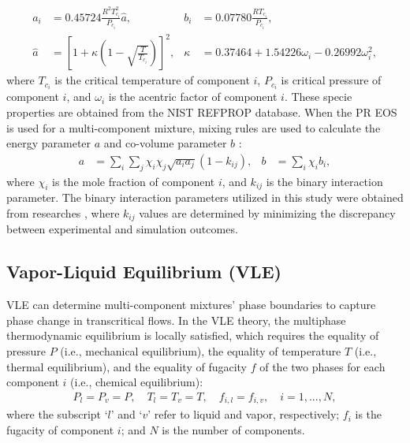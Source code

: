 \begin{align}
    a_i &= 0.45724\frac{R^2 T_{c_i}^2}{P_{c_i}} \hat{a} , &b_i&=0.07780\frac{RT_{c_i}}{P_{c_i}} \label{eq:ab},\\
    \hat{a}&=\left[1+\kappa\left(1-\sqrt{\frac{T}{T_{c_i}}}\right)\right]^2, &\kappa&=0.37464+1.54226\omega_i-0.26992\omega_i^2,
\end{align}
where $T_{c_i}$ is the critical temperature of component $i$, $P_{c_i}$ is critical pressure of component $i$, and $\omega_i$ is the acentric factor of component $i$. These specie properties are obtained from the NIST REFPROP database. When the PR EOS is used for a multi-component mixture, mixing rules are used to calculate the energy parameter $a$ and co-volume parameter $b$ \cite{reid1977properties}:
\begin{align}
a&=\sum_i\sum_j\chi_i\chi_j\sqrt{a_ia_j}(1-k_{ij}),& b&=\sum_i\chi_i b_i,\label{eq:mix}
\end{align}
where $\chi_i$ is the mole fraction of component $i$, and $k_{ij}$ is the binary interaction parameter. The binary interaction parameters utilized in this study were obtained from researches \cite{eliosa2009vapor,garcia2011vapor}, where $k_{ij}$ values are determined by minimizing the discrepancy between experimental and simulation outcomes.

\subsection{Vapor-Liquid Equilibrium (VLE)}
VLE can determine multi-component mixtures' phase boundaries to capture phase change in transcritical flows. In the VLE theory, the multiphase thermodynamic equilibrium is locally satisfied, which requires the equality of pressure $P$ (i.e., mechanical equilibrium), the equality of temperature $T$ (i.e., thermal equilibrium), and the equality of fugacity $f$ of the two phases for each component $i$ (i.e., chemical equilibrium):
\begin{align}
P_l=P_v=P,\quad T_l=T_v=T,\quad f_{i,l}=f_{i,v},\quad i=1,...,N, \label{eq:eq}
\end{align}
where the subscript `$l$' and `$v$' refer to liquid and vapor, respectively; $f_i$ is the fugacity of component $i$; and $N$ is the number of components.


